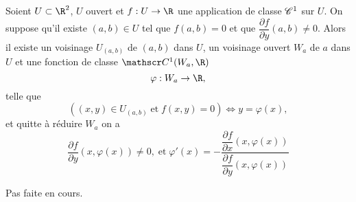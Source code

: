 \documentclass[12pt, class=report,crop=false]{standalone}
\begin{document}
{{\begin{proposition} 
\textcolor[rgb]{0.44,0.00,0.87}{ 
Soient $U \subset \R^2$, $U$ ouvert et $f:U \rightarrow \R$ une application
de classe $\mathscr{C}^1$ sur $U$. On suppose qu'il existe $(a,b) \in U$ tel que 
$f(a,b)=0$ et que $\dfrac{\partial f}{\partial y}(a,b) \neq 0$.
Alors il existe un voisinage $U_{(a,b)}$ de $(a,b)$ dans $U$, un voisinage
ouvert $W_a$ de $a$ dans $U$ et une fonction de classe $\co^1 (W_a, \R)$
\begin{equation*}
\varphi: W_a \rightarrow \R,
\end{equation*}
telle que
\begin{equation*}
((x,y) \in U_{(a,b)} \;\mathrm{et\;} f(x,y)=0)\Leftrightarrow y=\varphi(x),
\end{equation*}
et quitte à réduire $W_a$ on a 
\begin{equation*}
\dfrac{\partial f}{\partial y}(x,\varphi(x)) \neq 0, \; \mathrm{et \;}\varphi'(x)=-\dfrac{\dfrac{\partial f}{\partial x}(x,\varphi(x))}{\dfrac{\partial f}{\partial y}(x,\varphi(x))}
\end{equation*}
 }
\end{proposition}

 Pas faite en cours.

}}
\end{document}
